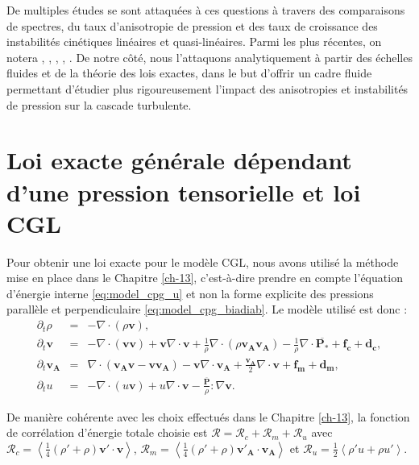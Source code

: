 De multiples études se sont attaquées à ces questions à travers des comparaisons de spectres, du taux d'anisotropie de pression et des taux de croissance des instabilités cinétiques linéaires et quasi-linéaires. Parmi les plus récentes, on notera \cite{qudsi_intermittency_2020}, \cite{markovskii_effect_2022}, \cite{opie_conditions_2022}, \cite{bandyopadhyay_interplay_2022}, \cite{navarro_effects_2023}. 
De notre côté, nous l'attaquons analytiquement à partir des échelles fluides et de la théorie des lois exactes, dans le but d'offrir un cadre fluide permettant d'étudier plus rigoureusement l'impact des anisotropies et instabilités de pression sur la cascade turbulente.

\section{Loi exacte générale dépendant d'une pression tensorielle et loi CGL}
\label{sec-213}

Pour obtenir une loi exacte pour le modèle \ac{CGL}, nous avons utilisé la méthode mise en place dans le Chapitre \ref{ch-13}, c'est-à-dire prendre en compte l'équation d'énergie interne \eqref{eq:model_cpg_u} et non la forme explicite des pressions parallèle et perpendiculaire \eqref{eq:model_cpg_biadiab}. Le modèle utilisé est donc :
\begin{eqnarray}
\label{eq:turb_cpg_r} \partial_t \rho &=& - \nabla \cdot \left(\rho \boldsymbol{v}\right) , \\
\label{eq:turb_cpg_v}\partial_t  \boldsymbol{v} &=&- \nabla \cdot \left(\boldsymbol{v}\boldsymbol{v}\right) + \boldsymbol{v} \nabla \cdot \boldsymbol{v}  + \frac{1}{\rho} \nabla \cdot \left(\rho \boldsymbol{v_A}\boldsymbol{v_A}\right) - \frac{1}{\rho}  \nabla \cdot \overline{\boldsymbol{P_*}}  + \boldsymbol{f_c} + \boldsymbol{d_c} ,\\
\label{eq:turb_cpg_b}\partial_t \boldsymbol{v_A} &=&   \nabla \cdot \left(\boldsymbol{v_A}\boldsymbol{v} - \boldsymbol{v}\boldsymbol{v_A}\right) -  \boldsymbol{v}  \nabla \cdot \boldsymbol{v_A} +  \frac{\boldsymbol{v_A}}{2}  \nabla \cdot \boldsymbol{v} + \boldsymbol{f_m} + \boldsymbol{d_m} ,\\
\label{eq:turb_cpg_u}    \partial_t u  &=& - \nabla \cdot \left(u \boldsymbol{v} \right) + u  \nabla \cdot \boldsymbol{v}  -  \frac{\overline{\boldsymbol{P}}}{\rho} : \nabla \boldsymbol{v} . 
\end{eqnarray}

De manière cohérente avec les choix effectués dans le Chapitre \ref{ch-13}, la fonction de corrélation d'énergie totale choisie est $\mathcal{R} = \mathcal{R}_{c} + \mathcal{R}_{m} + \mathcal{R}_{u}$ avec $\mathcal{R}_{c} = \left<\frac{1}{4} \left(\rho'+\rho\right) \boldsymbol{v'} \cdot  \boldsymbol{v} \right>$, $\mathcal{R}_{m} = \left<\frac{1}{4} \left(\rho'+\rho\right) \boldsymbol{v'_A} \cdot  \boldsymbol{v_A} \right>$ et $\mathcal{R}_{u} = \frac{1}{2}\left< \rho' u + \rho u'\right> $. 

